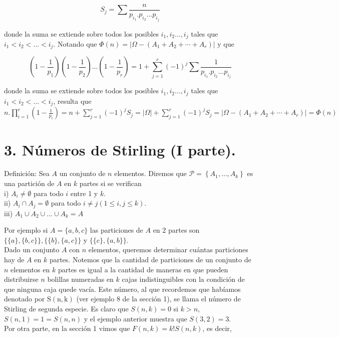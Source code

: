 \documentclass[10pt]{article}
\begin{document}
$$
S_{j}=\sum \frac{n}{p_{i_{1}} . p_{i_{2}} \ldots p_{i_{j}}}
$$

donde la suma se extiende sobre todos los posibles $i_{1}, i_{2} \ldots, i_{j}$ tales que $i_{1}<i_{2}<\ldots<i_{j}$. Notando que $\Phi(n)=\left|\Omega-\left(A_{1}+A_{2}+\cdots+A_{r}\right)\right|$ y que

$$
\left(1-\frac{1}{p_{1}}\right)\left(1-\frac{1}{p_{2}}\right) \ldots\left(1-\frac{1}{p_{r}}\right)=1+\sum_{j=1}^{r}(-1)^{j} \sum \frac{1}{p_{i_{1}} . p_{i_{2}} \ldots p_{i_{j}}}
$$

donde la suma se extiende sobre todos los posibles $i_{1}, i_{2} \ldots, i_{j}$ tales que $i_{1}<i_{2}<\ldots<i_{j}$, resulta que\\
$n . \prod_{i=1}^{r}\left(1-\frac{1}{p_{i}}\right)=n+\sum_{j=1}^{r}(-1)^{j} S_{j}=|\Omega|+\sum_{j=1}^{r}(-1)^{j} S_{j}=\left|\Omega-\left(A_{1}+A_{2}+\cdots+A_{r}\right)\right|=\Phi(n)$

\section*{3. Números de Stirling (I parte).}
Definición: Sea $A$ un conjunto de $n$ elementos. Diremos que $\mathcal{P}=\left\{A_{1}, \ldots, A_{k}\right\}$ es una partición de $A$ en $k$ partes si se verifican\\
i) $A_{i} \neq \emptyset$ para todo $i$ entre 1 y $k$.\\
ii) $A_{i} \cap A_{j}=\emptyset$ para todo $i \neq j(1 \leq i, j \leq k)$.\\
iii) $A_{1} \cup A_{2} \cup \ldots \cup A_{k}=A$

Por ejemplo si $A=\{a, b, c\}$ las particiones de $A$ en 2 partes son $\{\{a\},\{b, c\}\},\{\{b\},\{a, c\}\}$ y $\{\{c\},\{a, b\}\}$.\\
Dado un conjunto $A$ con $n$ elementos, queremos determinar cuántas particiones hay de $A$ en $k$ partes. Notemos que la cantidad de particiones de un conjunto de $n$ elementos en $k$ partes es igual a la cantidad de maneras en que pueden distribuirse $n$ bolillas numeradas en $k$ cajas indistinguibles con la condición de que ninguna caja quede vacía. Este número, al que recordemos que habíamos denotado por $\mathrm{S}(\mathrm{n}, \mathrm{k})$ (ver ejemplo 8 de la sección 1), se llama el número de Stirling de segunda especie. Es claro que $S(n, k)=0$ si $k>n$, $S(n, 1)=1=S(n, n)$ y el ejemplo anterior muestra que $S(3,2)=3$.\\
Por otra parte, en la sección 1 vimos que $F(n, k)=k!S(n, k)$, es decir,
\end{document}

